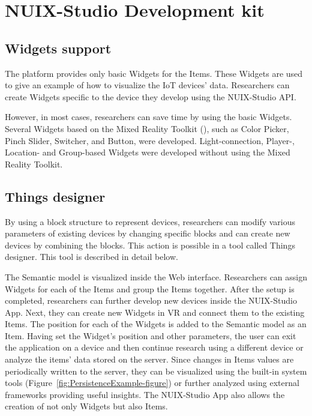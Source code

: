 
\chapter{NUIX-Studio Development kit}

\section{Widgets support}

The platform provides only basic Widgets for the Items. These Widgets are used to give an example of how to visualize the IoT devices' data. Researchers can create Widgets specific to the device they develop using the NUIX-Studio API.

However, in most cases, researchers can save time by using the basic Widgets. Several Widgets based on the Mixed Reality Toolkit (\cite{MRTK2021}), such as Color Picker, Pinch Slider, Switcher, and Button, were developed. Light-connection, Player-, Location- and Group-based Widgets were developed without using the Mixed Reality Toolkit.

\section{Things designer}

By using a block structure to represent devices, researchers can modify various parameters of existing devices by changing specific blocks and can create new devices by combining the blocks. This action is possible in a tool called Things designer. This tool is described in detail below.

The Semantic model is visualized inside the Web interface. Researchers can assign Widgets for each of the Items and group the Items together. After the setup is completed, researchers can further develop new devices inside the NUIX-Studio App. Next, they can create new Widgets in VR and connect them to the existing Items. The position for each of the Widgets is added to the Semantic model as an Item. Having set the Widget's position and other parameters, the user can exit the application on a device and then continue research using a different device or analyze the items' data stored on the server. Since changes in Items values are periodically written to the server, they can be visualized using the built-in system tools (Figure~\ref{fig:PersistenceExample-figure}) or further analyzed using external frameworks providing useful insights. The NUIX-Studio App also allows the creation of not only Widgets but also Items.

